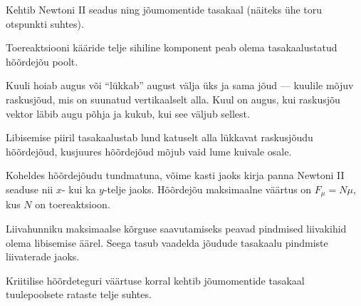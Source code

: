 \documentclass[10pt, twoside]{article}
\begin{document}
{%

\hint
Kehtib Newtoni II seadus ning jõumomentide tasakaal (näiteks ühe toru otspunkti suhtes).
\probend
\bigskip


\hint
Toereaktsiooni kääride telje sihiline komponent peab olema tasakaalustatud hõõrdejõu poolt.
\probend
\bigskip


\hint
Kuuli hoiab augus või \enquote{lükkab} august välja üks ja sama jõud --- kuulile mõjuv raskusjõud, mis on suunatud vertikaalselt alla. Kuul on augus, kui raskusjõu vektor läbib augu põhja ja kukub, kui see väljub sellest.
\probend
\bigskip


\hint
Libisemise piiril tasakaalustab lund katuselt alla lükkavat raskusjõudu hõõrdejõud, kusjuures hõõrdejõud mõjub vaid lume kuivale osale.
\probend
\bigskip


\hint
Koheldes hõõrdejõudu tundmatuna, võime kasti jaoks kirja panna Newtoni II seaduse nii $x$- kui ka $y$-telje jaoks. Hõõrdejõu maksimaalne väärtus on $F_\mu = N\mu$, kus $N$ on toereaktsioon.
\probend
\bigskip


\hint
Liivahunniku maksimaalse kõrguse saavutamiseks peavad pindmised liivakihid
olema libisemise äärel. Seega tasub vaadelda jõudude tasakaalu pindmiste liivaterade jaoks.
\probend
\bigskip


\hint
Kriitilise hõõrdeteguri väärtuse korral kehtib jõumomentide tasakaal tuulepoolsete rataste telje suhtes.
\probend
\bigskip

}
\end{document}

